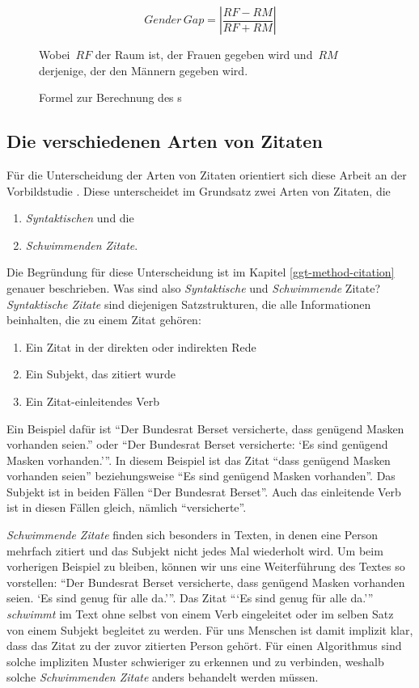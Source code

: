 \begin{figure}[H]
    \begin{equation}
        Gender \, Gap = \left|\frac{RF - RM}{RF + RM}\right|
    \end{equation}
    \parbox{\linewidth}{Wobei~$RF$ der Raum ist, der Frauen gegeben wird und~$RM$ derjenige, der den Männern gegeben wird.}
    \caption{Formel zur Berechnung des s}
    \label{ggt-formula}
\end{figure}

\subsection{Die verschiedenen Arten von Zitaten}\label{types-of-citations}

Für die Unterscheidung der Arten von Zitaten orientiert sich diese Arbeit
an der Vorbildstudie  \cite{gender_gap_tracker}. Diese unterscheidet im Grundsatz
zwei Arten von Zitaten, die
\begin{enumerate}
    \item \textsl{Syntaktischen} und die
    \item \textsl{Schwimmenden Zitate}.
\end{enumerate}

Die Begründung für diese Unterscheidung ist im Kapitel \ref{ggt-method-citation} genauer
beschrieben. Was sind also \textsl{Syntaktische} und \textsl{Schwimmende} Zitate? \textsl{Syntaktische Zitate}
sind diejenigen Satzstrukturen, die alle Informationen beinhalten, die zu einem Zitat gehören:
\begin{enumerate}
    \item Ein Zitat in der direkten oder indirekten Rede
    \item Ein Subjekt, das zitiert wurde
    \item Ein Zitat-einleitendes Verb
\end{enumerate}
Ein Beispiel dafür ist \enquote{Der Bundesrat Berset versicherte, dass genügend Masken vorhanden seien.} oder \enquote{Der Bundesrat Berset versicherte: \enquote{Es sind genügend Masken vorhanden.}}.
In diesem Beispiel ist das Zitat \enquote{dass genügend Masken vorhanden seien} beziehungsweise \enquote{Es sind genügend Masken vorhanden}. Das Subjekt ist in beiden Fällen
\enquote{Der Bundesrat Berset}. Auch das einleitende Verb ist in diesen Fällen gleich, nämlich \enquote{versicherte}.

\textsl{Schwimmende Zitate} finden sich besonders in Texten, in denen eine Person mehrfach zitiert und das Subjekt nicht jedes Mal wiederholt wird.
Um beim vorherigen Beispiel zu bleiben, können wir uns eine Weiterführung des Textes so vorstellen: \enquote{Der Bundesrat Berset versicherte, dass genügend Masken vorhanden seien.
\enquote{Es sind genug für alle da.}}. Das Zitat \enquote{\enquote{Es sind genug für alle da.}} \textsl{schwimmt} im Text ohne selbst von einem Verb eingeleitet oder im selben Satz
von einem Subjekt begleitet zu werden. Für uns Menschen ist damit implizit klar, dass das Zitat zu der zuvor zitierten Person gehört.
Für einen Algorithmus sind solche impliziten Muster schwieriger zu erkennen und zu verbinden, weshalb solche \textsl{Schwimmenden Zitate} anders behandelt werden
müssen.


